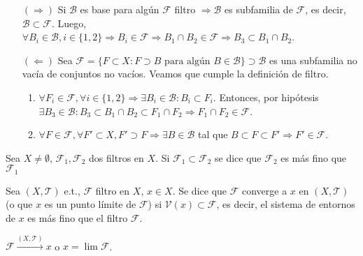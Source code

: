 \begin{dem}
  \begin{enumerate}[label=(\roman*)]
    \item []
    \item [$(\Rightarrow)$] Si $\mathcal{B}$ es base para algún $\mathcal{F}$ filtro $\Rightarrow \mathcal{B}$ es subfamilia de $\mathcal{F}$, es decir, $\mathcal{B} \subset \mathcal{F}$. Luego, $\forall B_{i} \in \mathcal{B}, i \in \{ 1, 2 \} \Rightarrow B_{i} \in \mathcal{F} \Rightarrow B_{1} \cap B_{2} \in \mathcal{F} \Rightarrow B_{3} \subset B_{1} \cap B_{2}$.
    \item [$(\Leftarrow)$] Sea $\mathcal{F} = \{ F \subset X : F \supset B \text{ para algún } B \in \mathcal{B} \} \supset \mathcal{B}$ es una subfamilia no vacía de conjuntos no vacíos. Veamos que cumple la definición de filtro.
      \begin{enumerate}[label=(\roman*)]
        \item $\forall F_{i} \in \mathcal{F}, \forall i \in \{ 1, 2 \} \Rightarrow \exists B_{i} \in \mathcal{B} : B_{i} \subset F_{i}$. Entonces, por hipótesis $\exists B_{3} \in \mathcal{B} : B_{3} \subset B_{1} \cap B_{2} \subset F_{1} \cap F_{2} \Rightarrow F_{1} \cap F_{2} \in \mathcal{F}$.
        \item $\forall F \in \mathcal{F}, \forall F' \subset X, F' \supset F \Rightarrow \exists B \in \mathcal{B}$ tal que $B \subset F \subset F' \Rightarrow F' \in \mathcal{F}$.
      \end{enumerate}
  \end{enumerate}
\end{dem}

\begin{defn}
  Sea $X \neq \emptyset$, $\mathcal{F}_{1}, \mathcal{F}_{2}$ dos filtros en $X$. Si $\mathcal{F}_{1} \subset \mathcal{F}_{2}$ se dice que $\mathcal{F}_{2}$ es más fino que $\mathcal{F}_{1}$
\end{defn}

\begin{defn}
  Sea $( X, \mathcal{T} )$ e.t., $\mathcal{F}$ filtro en $X$, $x \in X$. Se dice que $\mathcal{F}$ converge a $x$ en $( X, \mathcal{T} )$ (o que $x$ es un punto límite de $\mathcal{F}$) si $\mathcal{V}(x) \subset \mathcal{F}$, es decir, el sistema de entornos de $x$ es más fino que el filtro $\mathcal{F}$.
\end{defn}

\begin{nota}
  $\mathcal{F} \xrightarrow[]{ ( X, \mathcal{T} ) } x$ o $ x = \lim \mathcal{F}$.
\end{nota}

